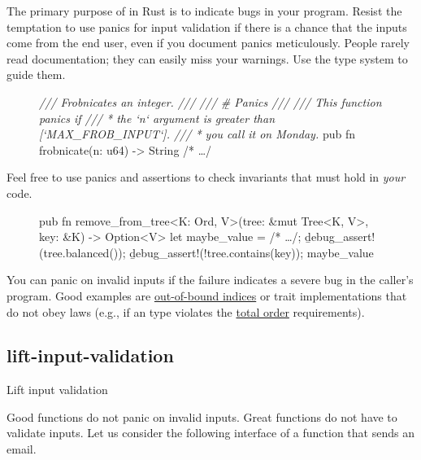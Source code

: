 \documentclass{article}
\begin{document}
The primary purpose of \href{https://doc.rust-lang.org/std/macro.panic.html}{} in Rust is to indicate bugs in your program.
Resist the temptation to use panics for input validation if there is a chance that the inputs come from the end user, even if you document panics meticulously.
People rarely read documentation; they can easily miss your warnings.
Use the type system to guide them.

\begin{figure}
\begin{code}[bad]
\emph{/// Frobnicates an integer.
///
/// \b{# Panics}
///
/// This function panics if
/// * the `n` argument is greater than [`MAX_FROB_INPUT`].
/// * you call it on Monday.}
pub fn frobnicate(n: u64) -> String { /* \ldots  */ }
\end{code}
\end{figure}

Feel free to use panics and assertions to check invariants that must hold in \emph{your} code.

\begin{figure}
\begin{code}[good]
pub fn remove_from_tree<K: Ord, V>(tree: &mut Tree<K, V>, key: &K) -> Option<V> {
  let maybe_value = /* \ldots  */;
  \b{debug_assert!}(tree.balanced());
  \b{debug_assert!}(!tree.contains(key));
  maybe_value
}
\end{code}
\end{figure}

You can panic on invalid inputs if the failure indicates a severe bug in the caller's program.
Good examples are \href{https://doc.rust-lang.org/1.62.0/std/ops/trait.Index.html#panics}{out-of-bound indices} or trait implementations that do not obey laws (e.g., if an \href{https://doc.rust-lang.org/1.62.0/std/cmp/trait.Ord.html}{} type violates the \href{https://en.wikipedia.org/wiki/Total_order}{total order} requirements).

\subsection{lift-input-validation}{Lift input validation}

Good functions do not panic on invalid inputs.
Great functions do not have to validate inputs.
Let us consider the following interface of a function that sends an email.
\end{document}
